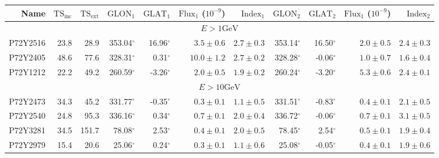 \documentclass[12pt,preprint]{aastex}
\newcommand{\gev}{\text{GeV}\xspace}
\newcommand{\tsext}{{\ensuremath{\text{TS}_\text{ext}}}\xspace}
\newcommand{\tsinc}{\ensuremath{\text{TS}_\text{inc}}\xspace}
\newcommand{\glon}{\text{GLON}\xspace}
\newcommand{\glat}{\text{GLAT}\xspace}
\renewcommand{\deg}{\ensuremath{^\circ}\xspace}
\begin{document}
\clearpage
\begin{table}
    \begin{centering}
      \begin{tabular}{r|rr|rrrr|rrrr}
        \hline
        \hline
        Name                 &     \tsinc &     \tsext &      $\glon_1$ &      $\glat_1$ & $\text{Flux}_1$ ($10^{-9}$) &   $\text{Index}_1$ &      $\glon_2$ &      $\glat_2$ & $\text{Flux}_1$ ($10^{-9}$) &  $\text{Index}_2$ \\
        \hline
        \multicolumn{11}{c}{$E > 1\gev$} \\
        \hline
        P72Y2516             &       23.8 &       28.9 &     353.04\deg &      16.96\deg & $       3.5 \pm        0.6$ & $  2.7 \pm   0.3$  &     353.14\deg &      16.50\deg & $       2.0 \pm        0.5$ & $  2.4 \pm   0.3$ \\
        P72Y2405             &       48.6 &       77.6 &     328.31\deg &       0.31\deg & $      10.0 \pm        1.2$ & $  2.7 \pm   0.2$  &     328.28\deg &      -0.06\deg & $       1.0 \pm        0.7$ & $  1.6 \pm   0.4$ \\
        P72Y1212             &       22.2 &       49.2 &     260.59\deg &      -3.26\deg & $       2.0 \pm        0.5$ & $  1.9 \pm   0.2$  &     260.24\deg &      -3.20\deg & $       5.3 \pm        0.6$ & $  2.4 \pm   0.1$ \\
        \hline
        \multicolumn{11}{c}{$E > 10\gev$} \\
        \hline
        P72Y2473             &       34.3 &       45.2 &     331.77\deg &      -0.35\deg & $       0.3 \pm        0.1$ & $  1.1 \pm   0.5$  &     331.51\deg &      -0.83\deg & $       0.4 \pm        0.1$ & $  2.1 \pm   0.5$ \\
        P72Y2540             &       24.8 &       95.3 &     336.16\deg &       0.34\deg & $       0.7 \pm        0.1$ & $  2.0 \pm   0.4$  &     336.72\deg &      -0.06\deg & $       0.7 \pm        0.1$ & $  3.1 \pm   0.5$ \\
        P72Y3281             &       34.5 &      151.7 &      78.08\deg &       2.53\deg & $       0.4 \pm        0.1$ & $  2.0 \pm   0.5$  &      78.45\deg &       2.54\deg & $       0.5 \pm        0.1$ & $  1.9 \pm   0.4$ \\
        P72Y2979             &       15.4 &       20.6 &      25.06\deg &       0.24\deg & $       0.3 \pm        0.1$ & $  1.1 \pm   0.6$  &      25.08\deg &      -0.05\deg & $       0.4 \pm        0.1$ & $  1.9 \pm   0.6$ \\

\end{tabular}
\end{centering}
\end{table}
\end{document}
